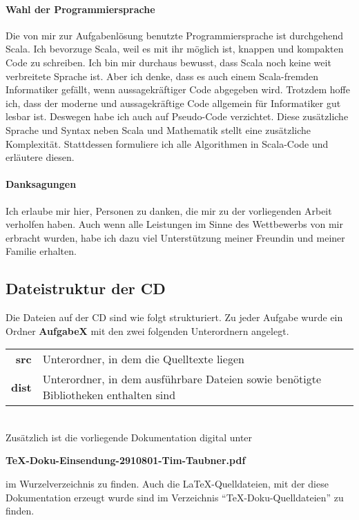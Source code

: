 \documentclass[a4paper,11pt]{scrartcl}
\begin{document}
\paragraph{Wahl der Programmiersprache}
 Die von mir zur Aufgabenlösung benutzte Programmiersprache ist durchgehend Scala.
 Ich bevorzuge Scala, weil es mit ihr möglich ist, knappen und kompakten Code zu schreiben.
 Ich bin mir durchaus bewusst, dass Scala noch keine weit verbreitete Sprache ist.
 Aber ich denke, dass es auch einem Scala-fremden Informatiker gefällt, wenn aussagekräftiger Code abgegeben wird.
 Trotzdem hoffe ich, dass der moderne und aussagekräftige Code allgemein für Informatiker gut lesbar ist.
 Deswegen habe ich auch auf Pseudo-Code verzichtet. Diese zusätzliche Sprache und Syntax neben Scala und Mathematik stellt eine zusätzliche Komplexität.
 Stattdessen formuliere ich alle Algorithmen in Scala-Code und erläutere diesen.
\paragraph{Danksagungen}
 Ich erlaube mir hier, Personen zu danken, die mir zu der vorliegenden Arbeit verholfen haben.
 Auch wenn alle Leistungen im Sinne des Wettbewerbs von mir erbracht wurden, habe ich dazu viel Unterstützung meiner Freundin und meiner Familie erhalten.
\subsection{Dateistruktur der CD}
 Die Dateien auf der CD sind wie folgt strukturiert.
 Zu jeder Aufgabe wurde ein Ordner \textbf{AufgabeX} mit den zwei folgenden Unterordnern angelegt.\\
 \begin{tabular}{rl}
  \textbf{src}  & Unterordner, in dem die Quelltexte liegen \\
  \textbf{dist} & Unterordner, in dem ausführbare Dateien sowie benötigte Bibliotheken enthalten sind \\
 \end{tabular}\\ \newline
 Zusätzlich ist die vorliegende Dokumentation digital unter
 \begin{center}\textbf{TeX-Doku-Einsendung-2910801-Tim-Taubner.pdf}\end{center}
 im Wurzelverzeichnis zu finden.
 Auch die \LaTeX-Quelldateien, mit der diese Dokumentation erzeugt wurde sind im Verzeichnis ``TeX-Doku-Quelldateien'' zu finden.
\end{document}
